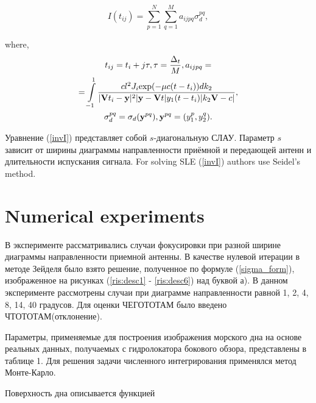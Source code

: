 \documentclass{procDDs}
\begin{document}
\begin{equation}
\label{invI}
	I(t_{ij}) = \sum \limits_{p=1}^{N} \sum \limits_{q=1}^{M} a_{ijpq}\sigma_d^{pq},
\end{equation}

where,
\begin{multline*}
t_{ij} = t_i+j\tau, \tau = \frac{\Delta_t}{M}, a_{ijpq} = \\ 
=  \int\limits_{-1}^{1}
\frac{cl^2J_i \text{exp}(-\mu c(t-t_i))dk_2}{|\mathbf{V}t_i-\mathbf{y}|^2|\mathbf{y}-\mathbf{V}t|y_1(t-t_i)|k_2 \mathbf{V}-c|}, \\
\sigma_d^{pq} = \sigma_d(\textbf{y}^{pq}), \textbf{y}^{pq} = (y_1^p, y_2^q).
\end{multline*}

Уравнение (\ref{invI}) представляет собой $s$-диагональную СЛАУ. Параметр $s$ зависит от ширины диаграммы направленности приёмной и передающей антенн и длительности испускания сигнала. For solving SLE (\ref{invI}) authors use  Seidel's method.
\section{Numerical experiments}

В эксперименте рассматривались случаи фокусировки при разной ширине диаграммы направленности приемной антенны. В качестве нулевой итерации в методе Зейделя было взято решение, полученное по формуле (\ref{sigma_form}), изображенное на рисунках (\ref{ris:desc1} - \ref{ris:desc6}) над буквой а). В данном эксперименте рассмотрены случаи при диаграмме направленности равной 1, 2, 4, 8, 14, 40 градусов. Для оценки ЧЕГОТОТАМ было введено ЧТОТОТАМ(отклонение). 

Параметры, применяемые для построения изображения морского дна на основе реальных данных, получаемых с гидролокатора бокового обзора, представлены в таблице 1. Для решения задачи численного интегрирования применялся метод Монте-Карло. 

\begin{table}[!ht]
	\label{table:name}
\end{table}

Поверхность дна описывается функцией 
\end{document}
